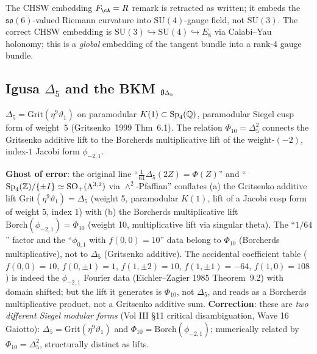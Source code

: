 The CHSW embedding $F_\cA = R$ remark is retracted as written; it embeds the $\mathfrak{so}(6)$-valued Riemann curvature into $\mathrm{SU}(4)$-gauge field, not $\mathrm{SU}(3)$. The correct CHSW embedding is $\mathrm{SU}(3) \hookrightarrow \mathrm{SU}(4) \hookrightarrow E_8$ via Calabi--Yau holonomy; this is a \emph{global} embedding of the tangent bundle into a rank-4 gauge bundle.

\subsection{Igusa $\Delta_5$ and the BKM $\mathfrak{g}_{\Delta_5}$}
\label{wn:subsec:healed-delta5}

\begin{theorem}\ClaimStatusHealed
\label{wn:thm:healed-gritsenko}
$\Delta_5 = \mathrm{Grit}(\eta^9 \vartheta_1)$ on paramodular $K(1) \subset \mathrm{Sp}_4(\mathbb{Q})$, paramodular Siegel cusp form of weight~$5$ (Gritsenko~1999 Thm~6.1). The relation $\Phi_{10} = \Delta_5^2$ connects the Gritsenko additive lift to the Borcherds multiplicative lift of the weight-$(-2)$, index-$1$ Jacobi form $\phi_{-2, 1}$.
\end{theorem}

\textbf{Ghost of error}: the original line ``$\tfrac{1}{64}\Delta_5(2Z) = \Phi(Z)$'' and ``$\mathrm{Sp}_4(\mathbb{Z})/\{\pm I\} \simeq \mathrm{SO}_+(\Lambda^{3, 2})$ via $\wedge^2$-Pfaffian'' conflates (a) the Gritsenko additive lift $\mathrm{Grit}(\eta^9 \vartheta_1) = \Delta_5$ (weight 5, paramodular $K(1)$, lift of a Jacobi cusp form of weight $5$, index $1$) with (b) the Borcherds multiplicative lift $\mathrm{Borch}(\phi_{-2, 1}) = \Phi_{10}$ (weight 10, multiplicative lift via singular theta). The ``$1/64$'' factor and the ``$\phi_{0, 1}$ with $f(0, 0) = 10$'' data belong to $\Phi_{10}$ (Borcherds multiplicative), not to $\Delta_5$ (Gritsenko additive). The accidental coefficient table ($f(0, 0) = 10$, $f(0, \pm 1) = 1$, $f(1, \pm 2) = 10$, $f(1, \pm 1) = -64$, $f(1, 0) = 108$) is indeed the $\phi_{-2, 1}$ Fourier data (Eichler--Zagier 1985 Theorem~9.2) with domain shifted; but the lift it generates is $\Phi_{10}$, not $\Delta_5$, and reads as a Borcherds multiplicative product, not a Gritsenko additive sum. \textbf{Correction}: these are \emph{two different Siegel modular forms} (Vol III \S11 critical disambiguation, Wave 16 Gaiotto): $\Delta_5 = \mathrm{Grit}(\eta^9 \vartheta_1)$ and $\Phi_{10} = \mathrm{Borch}(\phi_{-2, 1})$; numerically related by $\Phi_{10} = \Delta_5^2$, structurally distinct as lifts.

